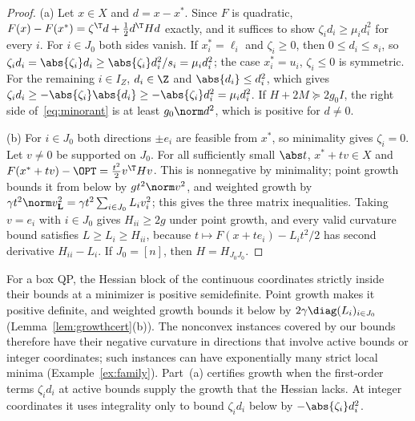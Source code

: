 \begin{proof}
(a) Let $x\in X$ and $d=x-x^*$. Since $F$ is quadratic,
$F(x)-F(x^*)=\zeta^{\T}d+\frac12d^{\T}Hd$ exactly, and it suffices to show
$\zeta_id_i\ge\mu_id_i^2$ for every $i$. For $i\in J_0$ both sides vanish. If
$x_i^*=\ell_i$ and $\zeta_i\ge0$, then $0\le d_i\le s_i$, so
$\zeta_id_i=\abs{\zeta_i}d_i\ge\abs{\zeta_i}d_i^2/s_i=\mu_id_i^2$; the case
$x_i^*=u_i$, $\zeta_i\le0$ is symmetric. For the remaining $i\in I_Z$, $d_i\in\Z$
and $\abs{d_i}\le d_i^2$, which gives
$\zeta_id_i\ge-\abs{\zeta_i}\abs{d_i}\ge-\abs{\zeta_i}d_i^2=\mu_id_i^2$. If
$H+2M\succeq2g_0I$, the right side of~\eqref{eq:minorant} is at least
$g_0\norm d^2$, which is positive for $d\ne0$.

(b) For $i\in J_0$ both directions $\pm e_i$ are feasible from $x^*$, so
minimality gives $\zeta_i=0$. Let $v\ne0$ be supported on $J_0$. For all
sufficiently small $\abs t$, $x^*+tv\in X$ and
$F(x^*+tv)-\OPT=\frac{t^2}2v^{\T}Hv$. This is nonnegative by minimality;
point growth bounds it from below by $gt^2\norm v^2$, and weighted growth by
$\gamma t^2\norm v_{\mathbf L}^2=\gamma t^2\sum_{i\in J_0}L_iv_i^2$; this gives
the three matrix inequalities. Taking $v=e_i$ with $i\in J_0$ gives
$H_{ii}\ge2g$ under point growth, and every valid curvature bound satisfies
$L\ge L_i\ge H_{ii}$, because $t\mapsto F(x+te_i)-L_it^2/2$ has second
derivative $H_{ii}-L_i$. If $J_0=[n]$, then $H=H_{J_0J_0}$.
\end{proof}

\begin{remark}\label{rem:nonconvex}
For a box QP, the Hessian block of the continuous coordinates strictly inside
their bounds at a minimizer is positive semidefinite. Point growth makes it
positive definite, and weighted growth bounds it below by
$2\gamma\diag(L_i)_{i\in J_0}$ (Lemma~\ref{lem:growthcert}(b)). The nonconvex
instances covered by our bounds therefore have their negative curvature in
directions that involve active bounds or integer coordinates; such instances
can have exponentially many strict local minima (Example~\ref{ex:family}).
Part~(a) certifies growth when the first-order terms $\zeta_id_i$ at active
bounds supply the growth that the Hessian lacks. At integer coordinates it
uses integrality only to bound $\zeta_id_i$ below by $-\abs{\zeta_i}d_i^2$.
\end{remark}
